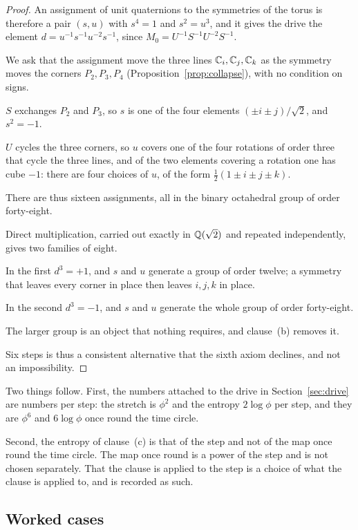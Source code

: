 \documentclass[11pt,a4paper]{article}
\theoremstyle{plain}
\theoremstyle{definition}
\theoremstyle{remark}
\begin{document}
\begin{proof}
An assignment of unit quaternions to the symmetries of the torus is therefore a pair $(s,u)$ with $s^{4}=1$ and $s^{2}=u^{3}$, and it gives the drive the element $d=u^{-1}s^{-1}u^{-2}s^{-1}$, since $M_{0}=U^{-1}S^{-1}U^{-2}S^{-1}$.

We ask that the assignment move the three lines $\mathbb{C}_{i},\mathbb{C}_{j},\mathbb{C}_{k}$ as the symmetry moves the corners $P_{2},P_{3},P_{4}$ (Proposition~\ref{prop:collapse}), with no condition on signs.

$S$ exchanges $P_{2}$ and $P_{3}$, so $s$ is one of the four elements $(\pm i\pm j)/\sqrt2$, and $s^{2}=-1$.

$U$ cycles the three corners, so $u$ covers one of the four rotations of order three that cycle the three lines, and of the two elements covering a rotation one has cube $-1$: there are four choices of $u$, of the form $\tfrac12(1\pm i\pm j\pm k)$.

There are thus sixteen assignments, all in the binary octahedral group of order forty-eight.

Direct multiplication, carried out exactly in $\mathbb{Q}(\sqrt2)$ and repeated independently, gives two families of eight.

In the first $d^{3}=+1$, and $s$ and $u$ generate a group of order twelve; a symmetry that leaves every corner in place then leaves $i,j,k$ in place.

In the second $d^{3}=-1$, and $s$ and $u$ generate the whole group of order forty-eight.

The larger group is an object that nothing requires, and clause~(b) removes it.

Six steps is thus a consistent alternative that the sixth axiom declines, and not an impossibility.
\end{proof}

Two things follow. First, the numbers attached to the drive in Section~\ref{sec:drive} are numbers per step: the stretch is $\phi^{2}$ and the entropy $2\log\phi$ per step, and they are $\phi^{6}$ and $6\log\phi$ once round the time circle.

Second, the entropy of clause~(c) is that of the step and not of the map once round the time circle. The map once round is a power of the step and is not chosen separately. That the clause is applied to the step is a choice of what the clause is applied to, and is recorded as such.

\subsection{Worked cases}\label{sec:base-worked}
\end{document}
